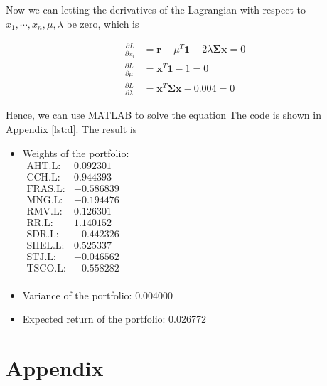 \documentclass[12pt]{article}
\begin{document}
Now we can letting the derivatives of the Lagrangian with respect to \(x_1,
\cdots, x_n, \mu, \lambda\) be zero, which is

\[
    \begin{aligned}
        \frac{\partial L}{\partial x_i}     & =\mathbf{r} - \mu^T \mathbf{1} -
        2\lambda \mathbf{\Sigma} \mathbf{x} = 0                                \\
        \frac{\partial L}{\partial \mu}     & =\mathbf{x}^T \mathbf{1} - 1 = 0 \\
        \frac{\partial L}{\partial \lambda} & =\mathbf{x}^T \mathbf{\Sigma}
        \mathbf{x} - 0.004 = 0
    \end{aligned}
\]

Hence, we can use MATLAB to solve the equation
The code is shown in Appendix \ref{lst:d}. The result is

\begin{itemize}
    \item Weights of the portfolio: \\ \(
          \begin{array}{rr}
              \text{AHT.L:}  & 0.092301  \\
              \text{CCH.L:}  & 0.944393  \\
              \text{FRAS.L:} & -0.586839 \\
              \text{MNG.L:}  & -0.194476 \\
              \text{RMV.L:}  & 0.126301  \\
              \text{RR.L:}   & 1.140152  \\
              \text{SDR.L:}  & -0.442326 \\
              \text{SHEL.L:} & 0.525337  \\
              \text{STJ.L:}  & -0.046562 \\
              \text{TSCO.L:} & -0.558282 \\
          \end{array}
          \)
    \item Variance of the portfolio: 0.004000
    \item Expected return of the portfolio: 0.026772
\end{itemize}

\clearpage
\appendix
\section*{Appendix}
\renewcommand{\thesubsection}{\Alph{subsection}}
\end{document}
